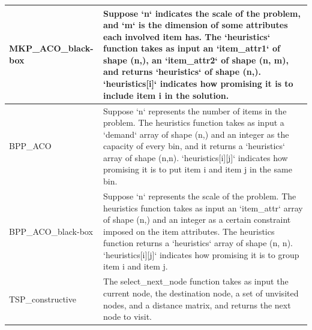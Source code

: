 {\begin{longtable}{l|p{10cm}}
    \midrule
    MKP\_ACO\_black-box &  Suppose `n` indicates the scale of the problem, and `m` is the dimension of some attributes each involved item has. The `heuristics` function takes as input an `item\_attr1` of shape (n,), an `item\_attr2` of shape (n, m), and returns `heuristics` of shape (n,). `heuristics[i]` indicates how promising it is to include item i in the solution.\\
    \midrule
    BPP\_ACO & Suppose `n` represents the number of items in the problem. The heuristics function takes as input a `demand` array of shape (n,) and an integer as the capacity of every bin, and it returns a `heuristics` array of shape (n,n). `heuristics[i][j]` indicates how promising it is to put item i and item j in the same bin. \\ 
    \midrule
    BPP\_ACO\_black-box & Suppose `n` represents the scale of the problem. The heuristics function takes as input an `item\_attr` array of shape (n,) and an integer as a certain constraint imposed on the item attributes. The heuristics function returns a `heuristics` array of shape (n, n). `heuristics[i][j]` indicates how promising it is to group item i and item j.\\
    \midrule
    TSP\_constructive & The select\_next\_node function takes as input the current node, the destination node, a set of unvisited nodes, and a distance matrix, and returns the next node to visit.\\ 
    \bottomrule
    \end{longtable}
}
